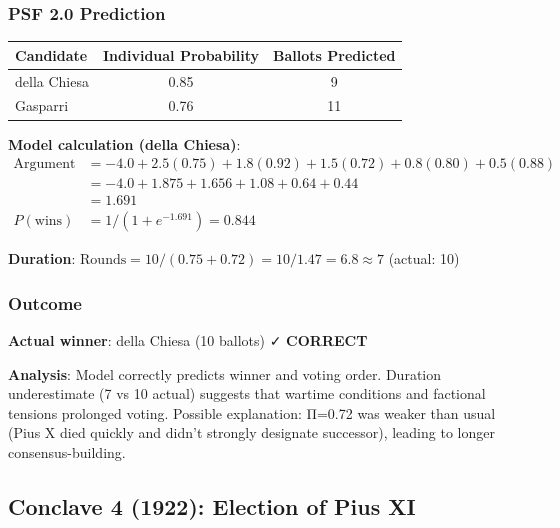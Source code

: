 \documentclass[11pt,a4paper]{article}
\begin{document}
\subsubsection{PSF 2.0 Prediction}

\begin{center}
\begin{tabular}{lcc}
\toprule
\textbf{Candidate} & \textbf{Individual Probability} & \textbf{Ballots Predicted} \\
\midrule
della Chiesa & 0.85 & 9 \\
Gasparri & 0.76 & 11 \\
\bottomrule
\end{tabular}
\end{center}

\textbf{Model calculation (della Chiesa)}:
\begin{equation}
\begin{split}
\text{Argument} &= -4.0 + 2.5(0.75) + 1.8(0.92) + 1.5(0.72) + 0.8(0.80) + 0.5(0.88) \\
&= -4.0 + 1.875 + 1.656 + 1.08 + 0.64 + 0.44 \\
&= 1.691 \\
P(\text{wins}) &= 1 / (1 + e^{-1.691}) = 0.844
\end{split}
\end{equation}

\textbf{Duration}: $\text{Rounds} = 10 / (0.75 + 0.72) = 10 / 1.47 = 6.8 \approx 7$ (actual: 10)

\subsubsection{Outcome}

\textbf{Actual winner}: della Chiesa (10 ballots) ✓ \textbf{CORRECT}

\textbf{Analysis}: Model correctly predicts winner and voting order. Duration underestimate (7 vs 10 actual) suggests that wartime conditions and factional tensions prolonged voting. Possible explanation: Π=0.72 was weaker than usual (Pius X died quickly and didn't strongly designate successor), leading to longer consensus-building.


\subsection{Conclave 4 (1922): Election of Pius XI}
\end{document}
